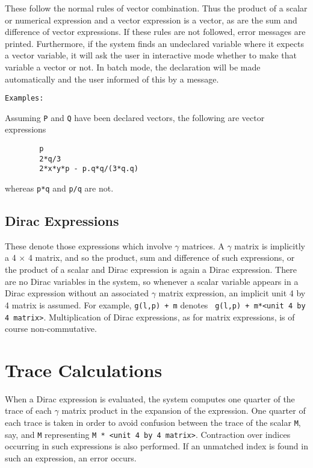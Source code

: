 \documentclass[11pt,letterpaper]{book}
\begin{document}
These follow the normal rules of vector combination. Thus the product of a
scalar or numerical expression and a vector expression is a vector, as are
the sum and difference of vector expressions. If these rules are not
followed, error messages are printed. Furthermore, if the system finds an
undeclared variable where it expects a vector variable, it will ask the
user in interactive mode whether to make that variable a vector or not. In
batch mode, the declaration will be made automatically and the user
informed of this by a message.

{\tt Examples:}

Assuming {\tt P} and {\tt Q} have been declared vectors, the following are
vector expressions
{\small\begin{verbatim}
        p
        2*q/3
        2*x*y*p - p.q*q/(3*q.q)
\end{verbatim}}
whereas {\tt p*q} and {\tt p/q} are not.

\subsection{Dirac Expressions}

These denote those expressions which involve $\gamma$ matrices. A $\gamma$
matrix is implicitly a 4 $\times$ 4 matrix, and so the product, sum and
difference of such expressions, or the product of a scalar and Dirac
expression is again a Dirac expression.  There are no Dirac variables in
the system, so whenever a scalar variable appears in a Dirac expression
without an associated $\gamma$ matrix expression, an implicit unit 4
by 4 matrix is assumed.  For example, {\tt g(l,p) + m} denotes {\tt
g(l,p) + m*<unit 4 by 4 matrix>}.  Multiplication of Dirac
expressions, as for matrix expressions, is of course non-commutative.

\section{Trace Calculations}

When a Dirac expression is evaluated, the system computes one quarter of
the trace of each $\gamma$ matrix product in the expansion of the expression.
One quarter of each trace is taken in order to avoid confusion between the
trace of the scalar {\tt M}, say, and {\tt M} representing {\tt M * <unit
4 by 4 matrix>}.  Contraction over indices occurring in such expressions is
also performed.  If an unmatched index is found in such an expression, an
error occurs.
\end{document}
